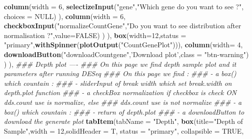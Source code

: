 \documentclass[
  12pt,
]{article}
\newenvironment{Shaded}{\begin{snugshade}}{\end{snugshade}}
\newcommand{\CommentTok}[1]{\textcolor[rgb]{0.56,0.35,0.01}{\textit{#1}}}
\newcommand{\DataTypeTok}[1]{\textcolor[rgb]{0.13,0.29,0.53}{#1}}
\newcommand{\DecValTok}[1]{\textcolor[rgb]{0.00,0.00,0.81}{#1}}
\newcommand{\KeywordTok}[1]{\textcolor[rgb]{0.13,0.29,0.53}{\textbf{#1}}}
\newcommand{\NormalTok}[1]{#1}
\newcommand{\OtherTok}[1]{\textcolor[rgb]{0.56,0.35,0.01}{#1}}
\newcommand{\StringTok}[1]{\textcolor[rgb]{0.31,0.60,0.02}{#1}}
\begin{document}
\begin{Shaded}
\begin{Highlighting}[]
                        \KeywordTok{column}\NormalTok{(}\DataTypeTok{width =} \DecValTok{6}\NormalTok{,}
                               \KeywordTok{selectizeInput}\NormalTok{(}\StringTok{"gene"}\NormalTok{,}\StringTok{"Which gene do you want to see ?"}\NormalTok{, }\DataTypeTok{choices =} \OtherTok{NULL}\NormalTok{)}
\NormalTok{                        ),}
                        \KeywordTok{column}\NormalTok{(}\DataTypeTok{width =} \DecValTok{6}\NormalTok{, }\KeywordTok{checkboxInput}\NormalTok{(}\StringTok{"normalizeCountGene"}\NormalTok{,}\StringTok{"Do you want to see distribution }
\StringTok{                                                        after normalisation ?"}\NormalTok{,}\DataTypeTok{value=}\OtherTok{FALSE}\NormalTok{)}
\NormalTok{                        )}
\NormalTok{                    ),}
                    \KeywordTok{box}\NormalTok{(}\DataTypeTok{width=}\DecValTok{12}\NormalTok{,}\DataTypeTok{status =} \StringTok{"primary"}\NormalTok{,}\KeywordTok{withSpinner}\NormalTok{(}\KeywordTok{plotOutput}\NormalTok{(}\StringTok{"CountGenePlot"}\NormalTok{))),}
                    \KeywordTok{column}\NormalTok{(}\DataTypeTok{width=} \DecValTok{4}\NormalTok{,}
                           \KeywordTok{downloadButton}\NormalTok{(}\StringTok{"downloadCountgene"}\NormalTok{,}\StringTok{'Download plot'}\NormalTok{,}\DataTypeTok{class =} \StringTok{"btn-warning"}\NormalTok{)}
\NormalTok{                    )}
\NormalTok{            ),}
            \CommentTok{### Depth plot ----}
            \CommentTok{### On this page we find depth sample plot and it parameters after running DESeq}
            \CommentTok{### On this page we find :}
            \CommentTok{###     - a box() which countain :}
            \CommentTok{###         - sliderInput of break width which set break.width on depth.plot function}
            \CommentTok{###         - a checkBox normalization if checkbox is check ON dds.count use is normalize, else }
            \CommentTok{###           dds.count use is not normalize}
            \CommentTok{###     - a box() which countain :}
            \CommentTok{###         - return of depth.plot }
            \CommentTok{###     - a downloadButton to download  the generate plot}
            \KeywordTok{tabItem}\NormalTok{(}\DataTypeTok{tabName =} \StringTok{"Depth"}\NormalTok{,}
                    \KeywordTok{box}\NormalTok{(}\DataTypeTok{title=}\StringTok{"Depth of Sample"}\NormalTok{,}\DataTypeTok{width =} \DecValTok{12}\NormalTok{,}\DataTypeTok{solidHeader =}\NormalTok{ T, }\DataTypeTok{status =} \StringTok{"primary"}\NormalTok{,}
                        \DataTypeTok{collapsible =} \OtherTok{TRUE}\NormalTok{,}

\end{Highlighting}
\end{Shaded}
\end{document}
